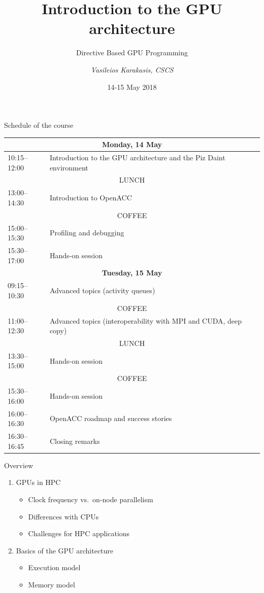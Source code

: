 \documentclass[aspectratio=169,12pt]{beamer}
\author{\emph{Vasileios Karakasis, CSCS}}
\title{Introduction to the GPU architecture}
\subtitle{Directive Based GPU Programming}
\date{14-15 May 2018}
\begin{document}
\cscstitle

\begin{frame}{Schedule of the course}
  \tiny
  \renewcommand\arraystretch{1.2}
  \begin{table}
    \centering
    \begin{tabular}{ll}
      \multicolumn{2}{c}{\bfseries Monday, 14 May} \\\hline
      10:15--12:00 & Introduction to the GPU architecture and the Piz Daint environment \\\hline
      \multicolumn{2}{c}{\tiny LUNCH} \\\hline
      13:00--14:30 & Introduction to OpenACC \\\hline
      \multicolumn{2}{c}{\tiny COFFEE} \\\hline
      15:00--15:30 & Profiling and debugging \\
      15:30--17:00 & Hands-on session \\\hline
      \multicolumn{2}{c}{\bfseries Tuesday, 15 May} \\\hline
      09:15--10:30 & Advanced topics (activity queues) \\\hline
      \multicolumn{2}{c}{\tiny COFFEE} \\\hline
      11:00--12:30 & Advanced topics (interoperability with MPI and CUDA, deep copy) \\\hline
      \multicolumn{2}{c}{\tiny LUNCH} \\\hline
      13:30--15:00 & Hands-on session \\\hline
      \multicolumn{2}{c}{\tiny COFFEE} \\\hline
      15:30--16:00 & Hands-on session \\
      16:00--16:30 & OpenACC roadmap and success stories \\
      16:30--16:45 & Closing remarks \\
    \end{tabular}
  \end{table}
\end{frame}


\begin{frame}{Overview}
  \begin{enumerate}
  \item GPUs in HPC
    \begin{itemize}
    \item Clock frequency vs.\ on-node parallelism
    \item Differences with CPUs
    \item Challenges for HPC applications
    \end{itemize}
    \vspace\baselineskip
  \item Basics of the GPU architecture
    \begin{itemize}
    \item Execution model
    \item Memory model
    \end{itemize}
  \end{enumerate}
\end{frame}
\end{document}
